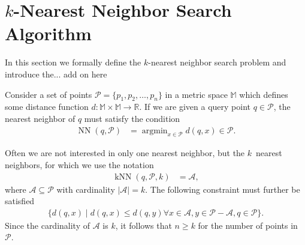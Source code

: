 \section{$k$-Nearest Neighbor Search Algorithm}
  \label{sec:_k_nearest_neighbor_search_algorithm}

  In this section we formally define the $k$-nearest neighbor search problem 
  and introduce the... add on here

   Consider a set of points $\mathcal{P} 
  = \{p_1,p_2,\dots,p_n\}$ in a metric space $\mathbb{M}$ which defines some 
  distance function $d\colon\mathbb{M}\times\mathbb{M}\to\mathbb{R}$.  If we 
  are given a query point $q\in\mathcal{P}$, the nearest neighbor of $q$ must 
  satisfy the condition
  \begin{align}
    \label{eq:NN}
    \operatorname{NN}(q,\mathcal{P}) &= \operatorname{argmin}_{x\in\mathcal{P}} 
    d(q,x)\in\mathcal{P}.
  \end{align}

  Often we are not interested in only one nearest neighbor, but the $k$~nearest 
  neighbors, for which we use the notation
  \begin{align}
    \label{eq:kNN}
    \operatorname{kNN}(q,\mathcal{P},k) &= \mathcal{A},
  \end{align}
  where $\mathcal{A}\subseteq\mathcal{P}$ with cardinality 
  $\vert\mathcal{A}\vert = k$.  The following constraint must further be 
  satisfied
  \begin{align}
    \label{eq:constraint_kNN}
    \{d(q,x)\mid d(q,x)\leq d(q,y)\forall x\in\mathcal{A}, 
    y\in\mathcal{P}-\mathcal{A},q\in\mathcal{P}\}.
  \end{align}
  Since the cardinality of $\mathcal{A}$ is $k$, it follows that $n\geq k$ for 
  the number of points in $\mathcal{P}$.





